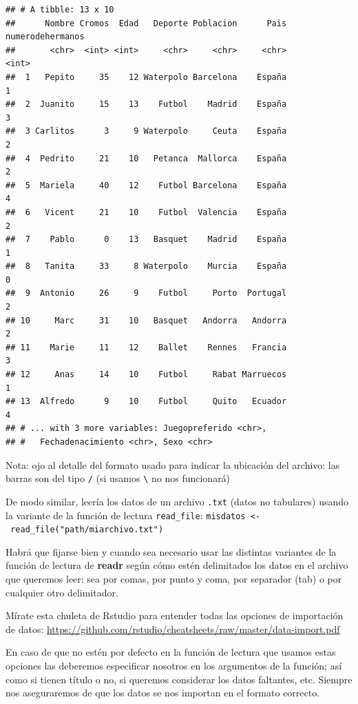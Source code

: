 \documentclass[]{book}
\theoremstyle{definition}
\theoremstyle{definition}
\theoremstyle{remark}
\begin{document}
\begin{verbatim}
## # A tibble: 13 x 10
##      Nombre Cromos  Edad   Deporte Poblacion      Pais numerodehermanos
##       <chr>  <int> <int>     <chr>     <chr>     <chr>            <int>
##  1   Pepito     35    12 Waterpolo Barcelona    España                1
##  2  Juanito     15    13    Futbol    Madrid    España                3
##  3 Carlitos      3     9 Waterpolo     Ceuta    España                2
##  4  Pedrito     21    10   Petanca  Mallorca    España                2
##  5  Mariela     40    12    Futbol Barcelona    España                4
##  6   Vicent     21    10    Futbol  Valencia    España                2
##  7    Pablo      0    13   Basquet    Madrid    España                1
##  8   Tanita     33     8 Waterpolo    Murcia    España                0
##  9  Antonio     26     9    Futbol     Porto  Portugal                2
## 10     Marc     31    10   Basquet   Andorra   Andorra                2
## 11    Marie     11    12    Ballet    Rennes   Francia                3
## 12     Anas     14    10    Futbol     Rabat Marruecos                1
## 13  Alfredo      9    10    Futbol     Quito   Ecuador                4
## # ... with 3 more variables: Juegopreferido <chr>,
## #   Fechadenacimiento <chr>, Sexo <chr>
\end{verbatim}

Nota: ojo al detalle del formato usado para indicar la ubicación del
archivo: las barras son del tipo \texttt{/} (si usamos
\texttt{\textbackslash{}} no nos funcionará)

De modo similar, leería los datos de un archivo \texttt{.txt} (datos no
tabulares) usando la variante de la función de lectura
\texttt{read\_file}:
\texttt{misdatos\ \textless{}-\ read\_file("path/miarchivo.txt")}

Habrá que fijarse bien y cuando sea necesario usar las distintas
variantes de la función de lectura de \textbf{readr} según cómo estén
delimitados los datos en el archivo que queremos leer: sea por comas,
por punto y coma, por separador (tab) o por cualquier otro delimitador.

Mírate esta chuleta de Rstudio para entender todas las opciones de
importación de datos:
\url{https://github.com/rstudio/cheatsheets/raw/master/data-import.pdf}

En caso de que no estén por defecto en la función de lectura que usamos
estas opciones las deberemos especificar nosotros en los argumentos de
la función; así como si tienen título o no, si queremos considerar los
datos faltantes, etc. Siempre nos aseguraremos de que los datos se nos
importan en el formato correcto.
\end{document}

